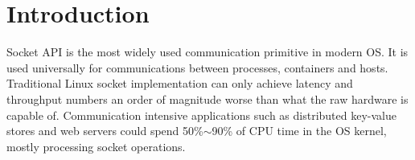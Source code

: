 \section{Introduction}
\label{sec:intro}


Socket API is the most widely used communication primitive in modern OS. It is used universally for communications between processes, containers and hosts.
Traditional Linux socket implementation can only achieve latency and throughput numbers an order of magnitude worse than what the raw hardware is capable of.
Communication intensive applications such as distributed key-value stores and web servers could spend 50\%$\sim$90\% of CPU time in the OS kernel, mostly processing socket operations.

